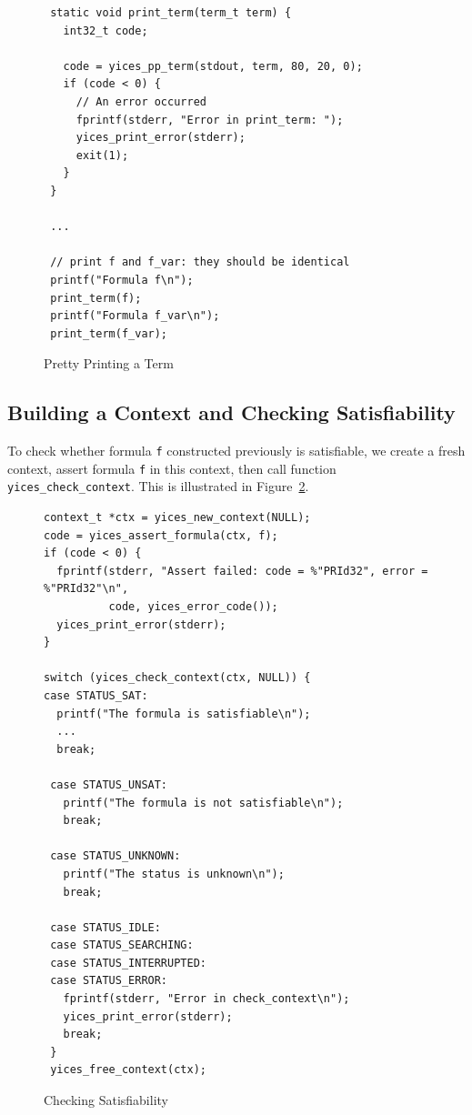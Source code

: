 \documentclass[11pt,twoside,fleqn,openright,titlepage]{cslreport}
\begin{document}
\begin{figure}
\begin{footnotesize}
\begin{verbatim}
 static void print_term(term_t term) {
   int32_t code;

   code = yices_pp_term(stdout, term, 80, 20, 0);
   if (code < 0) {
     // An error occurred
     fprintf(stderr, "Error in print_term: ");
     yices_print_error(stderr);
     exit(1);
   }
 }

 ...

 // print f and f_var: they should be identical
 printf("Formula f\n");
 print_term(f);
 printf("Formula f_var\n");
 print_term(f_var);
\end{verbatim}
\end{footnotesize}
\caption{Pretty Printing a Term}
\label{pretty-printing}
\end{figure}

\subsection*{Building a Context and Checking Satisfiability}

To check whether formula \texttt{f} constructed previously is
satisfiable, we create a fresh context, assert formula \texttt{f}
in this context, then call function
\texttt{yices\_check\_context}. This is illustrated in
Figure~\ref{context-check}.

\begin{figure}
\begin{footnotesize}
\begin{verbatim}
context_t *ctx = yices_new_context(NULL);
code = yices_assert_formula(ctx, f);
if (code < 0) {
  fprintf(stderr, "Assert failed: code = %"PRId32", error = %"PRId32"\n",
          code, yices_error_code());
  yices_print_error(stderr);
}

switch (yices_check_context(ctx, NULL)) {
case STATUS_SAT:
  printf("The formula is satisfiable\n");
  ...
  break;

 case STATUS_UNSAT:
   printf("The formula is not satisfiable\n");
   break;

 case STATUS_UNKNOWN:
   printf("The status is unknown\n");
   break;

 case STATUS_IDLE:
 case STATUS_SEARCHING:
 case STATUS_INTERRUPTED:
 case STATUS_ERROR:
   fprintf(stderr, "Error in check_context\n");
   yices_print_error(stderr);
   break;
 }
 yices_free_context(ctx);
\end{verbatim}
\end{footnotesize}
\caption{Checking Satisfiability}
\label{context-check}
\end{figure}
\end{document}
